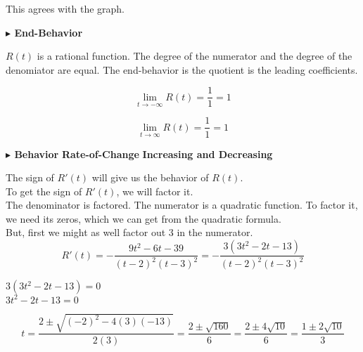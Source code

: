 \documentclass{ximera}
\begin{document}
\begin{example}
\begin{explanation}
\end{explanation}



This agrees with the graph.






\textbf{\textcolor{blue!55!black}{$\blacktriangleright$ End-Behavior}} 

$R(t)$ is a rational function. The degree of the numerator and the degree of the denomiator are equal.  The end-behavior is the quotient is the leading coefficients.



\[  
\lim\limits_{t \to -\infty}R(t) = \frac{1}{1} = 1
\]




\[  
\lim\limits_{t \to \infty}R(t) = \frac{1}{1} = 1
\]











\textbf{\textcolor{blue!55!black}{$\blacktriangleright$ Behavior}} 
\textbf{Rate-of-Change}  
\textbf{Increasing and Decreasing}   



The sign of $R'(t)$ will give us the behavior of $R(t)$. \\

To get the sign of $R'(t)$, we will factor it. \\

The denominator is factored.  The numerator is a quadratic function.  To factor it, we need its zeros, which we can get from the quadratic formula. \\

But, first we might as well factor out $3$ in the numerator. \\







\[   
R'(t) = -\frac{9 t^2 -6 t -39}{(t-2)^2 (t-3)^2} = -\frac{3 (3 t^2 - 2 t - 13)}{(t-2)^2 (t-3)^2}
\]




$3 (3 t^2 - 2 t - 13) = 0$ \\

$3 t^2 - 2 t - 13 = 0$ 



\[
t = \frac{2 \pm \sqrt{(-2)^2 - 4(3)(-13)}}{2(3)} = \frac{2 \pm \sqrt{160}}{6} = \frac{2 \pm 4 \sqrt{10}}{6} = \frac{1 \pm 2 \sqrt{10}}{3}
\]





\end{example}
\end{document}
